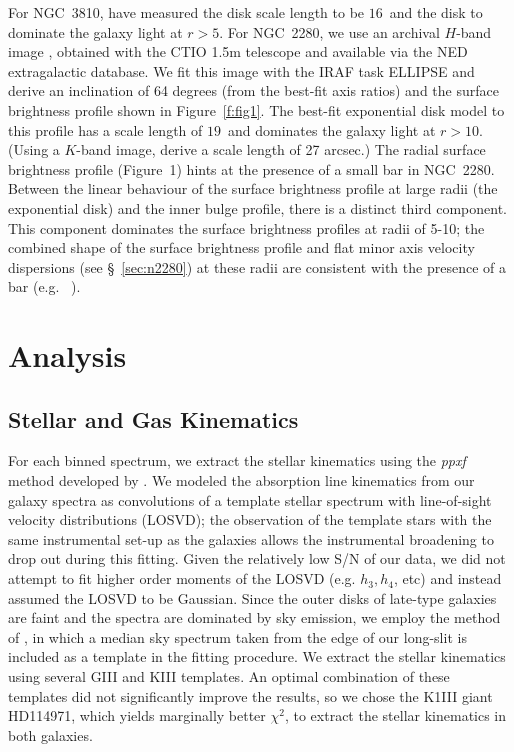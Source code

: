 \documentclass[useAMS,usenatbib]{mn2e}
\begin{document}
For NGC~3810, \citet{knapen2003} have measured the disk scale length to
be $16$\arcsec\ and the disk to dominate the galaxy light at
$r>5$\arcsec.  For NGC~2280, we use an archival $H$-band image
\citep{Eskridge2002}, obtained with the CTIO 1.5m telescope and
available via the NED extragalactic database.  
We fit this image with the IRAF task ELLIPSE and derive an inclination
of 64 degrees (from the best-fit axis ratios) and the surface brightness
profile shown in Figure~\ref{f:fig1}.  The best-fit exponential disk
model to this profile has a scale length of $19$\arcsec\ and dominates
the galaxy light at $r>10$\arcsec.  
(Using a $K$-band image, \citet{Kassin2006} derive a scale length of 27
arcsec.)
%
The radial surface brightness profile (Figure~1) hints at the presence
of a small bar in NGC~2280.  Between the linear behaviour of the surface
brightness profile at large radii (the exponential disk) and the inner
bulge profile, there is a distinct third component. This component
dominates the surface brightness profiles at radii of 5-10\arcsec; the
combined shape of the surface brightness profile and flat minor axis
velocity dispersions (see \S~\ref{sec:n2280}) at these radii are
consistent with the presence of a bar (e.g. ~\citealt{Prieto2001,
  Gerssen2003}).



\section{Analysis}
\label{s:Analysis}

\subsection{Stellar and Gas Kinematics}
\label{StellarKin}

For each binned spectrum, we extract the stellar kinematics using the
{\it ppxf} method developed by \citet{cap04}.  We modeled the absorption
line kinematics from our galaxy spectra as convolutions of a template
stellar spectrum with line-of-sight velocity distributions (LOSVD); the
observation of the template stars with the same instrumental set-up as
the galaxies allows the instrumental broadening to drop out during this
fitting.  Given the relatively low S/N of our data, we did not attempt
to fit higher order moments of the LOSVD (e.g. $h_3, h_4$, etc) and
instead assumed the LOSVD to be Gaussian.  Since the outer disks of
late-type galaxies are faint and the spectra are dominated by sky
emission, we employ the method of \citet{Weijmans2009}, in which a
median sky spectrum taken from the edge of our long-slit is included as
a template in the fitting procedure.  We extract the stellar kinematics
using several GIII and KIII templates.  An optimal combination of these
templates did not significantly improve the results, so we chose the
K1III giant HD114971, which yields marginally better $\chi^2$, to
extract the stellar kinematics in both galaxies.
\end{document}
